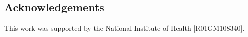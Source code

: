 \subsection*{Acknowledgements}
This work was supported by the National Institute of Health [R01GM108340].